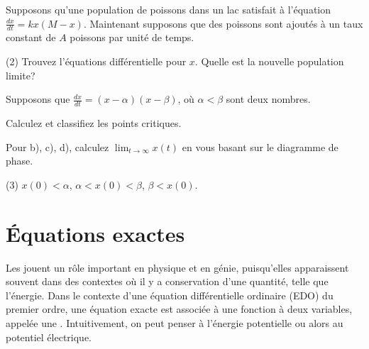 \begin{exercise}
	Supposons qu'une population de poissons dans un lac satisfait à l'équation 	$\frac{dx}{dt} = kx(M-x)$.
	Maintenant supposons que des poissons sont ajoutés à un taux constant de $A$ poissons par unité de temps.
	\begin{tasks}(2)
		\task Trouvez l'équations différentielle pour $x$.
		\task Quelle est la nouvelle population limite?
	\end{tasks}
\end{exercise}

\begin{exercise}
	Supposons que $\frac{dx}{dt} = (x-\alpha)(x-\beta)$, où $\alpha <
	\beta$ sont deux nombres.
	\begin{tasks}
		\task Calculez et classifiez les points critiques.
	\end{tasks}
	Pour b), c), d), calculez $\displaystyle \lim_{t\to\infty} x(t)$ en vous basant sur le diagramme de phase.
	\begin{tasks}[resume](3)
		\task $x(0) < \alpha$,
		\task $\alpha < x(0) < \beta$,
		\task $\beta < x(0)$.
	\end{tasks}
\end{exercise}


\sectionnewpage
\section{Équations exactes}
\label{exact:section}

Les \emph{} jouent un rôle important en physique et en génie,
puisqu'elles apparaissent souvent dans des contextes où il y a conservation d'une quantité, telle que l'énergie.
Dans le contexte d'une équation différentielle ordinaire (EDO) du premier ordre, une équation exacte est associée à une fonction à deux variables,
appelée une \emph{}.
Intuitivement, on peut penser à l'énergie potentielle ou alors au potentiel électrique.

